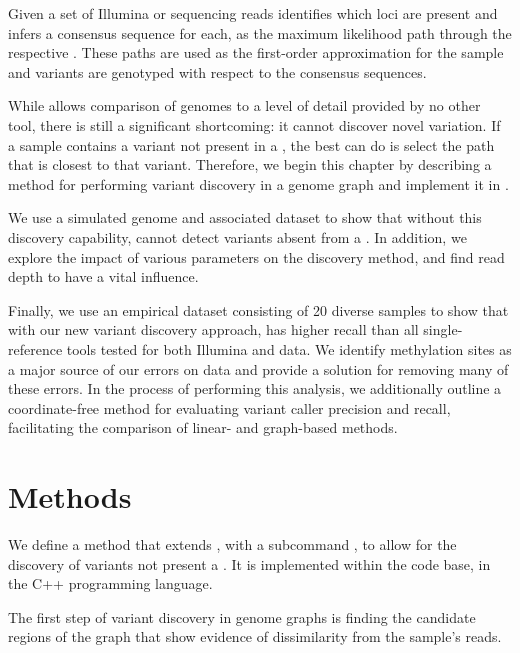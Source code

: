  Given a set of Illumina or \ont{} sequencing reads \pandora{} identifies which \panrg{} loci are present and infers a consensus sequence for each, as the maximum likelihood path through the respective \prg{}. These paths are used as the first-order approximation for the sample and variants are genotyped with respect to the consensus sequences. 
 
 While \pandora{} allows comparison of genomes to a level of detail provided by no other tool, there is still a significant shortcoming: it cannot discover novel variation. If a sample contains a variant not present in a \prg{}, the best \pandora{} can do is select the path that is closest to that variant. Therefore, we begin this chapter by describing a method for performing \denovo{} variant discovery in a genome graph and implement it in \pandora{}.
 
 We use a simulated genome and associated \ont{} dataset to show that without this discovery capability, \pandora{} cannot detect variants absent from a \prg{}. In addition, we explore the impact of various parameters on the \denovo{} discovery method, and find read depth to have a vital influence.
 
 Finally, we use an empirical dataset consisting of 20 diverse \ecoli{} samples to show that with our new variant discovery approach, \pandora{} has higher recall than all single-reference tools tested for both Illumina and \ont{} data. We identify methylation sites as a major source of our errors on \ont{} data and provide a solution for removing many of these errors. In the process of performing this analysis, we additionally outline a coordinate-free method for evaluating variant caller precision and recall, facilitating the comparison of linear- and graph-based methods. 

\section{Methods}
\label{sec:denovo-method}

We define a method that extends \pandora{}, with a subcommand , to allow for the \denovo{} discovery of variants not present a \prg{}. It is implemented within the \pandora{} code base, in the C++ programming language. 

The first step of \denovo{} variant discovery in genome graphs is finding the candidate regions of the graph that show evidence of dissimilarity from the sample's reads.

